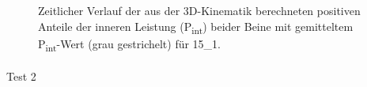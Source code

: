 \documentclass[
  letterpaper,
  DIV=11]{scrartcl}
\makeatletter
\let\oldparagraph\paragraph
\renewcommand{\paragraph}{
    \@ifstar
      \xxxParagraphStar
      \xxxParagraphNoStar
  }
\newcommand{\xxxParagraphStar}[1]{\oldparagraph*{#1}\mbox{}}
\newcommand{\xxxParagraphNoStar}[1]{\oldparagraph{#1}\mbox{}}
\makeatother
\begin{document}
\begin{figure}


\caption{\label{fig-PInt_Kinematik_15_1}Zeitlicher Verlauf der aus der
3D-Kinematik berechneten positiven Anteile der inneren Leistung
(P\textsubscript{int}) beider Beine mit gemitteltem
P\textsubscript{int}-Wert (grau gestrichelt) für 15\_1.}

\end{figure}%

\paragraph{Test 2}
\end{document}
